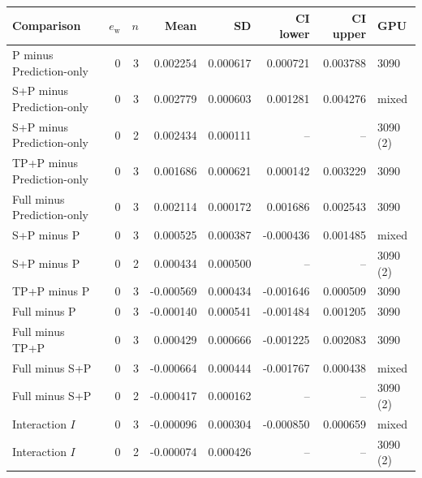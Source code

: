 \begingroup\color{revisionblue}
\sffamily\fontsize{9}{11}\selectfont\renewcommand{\arraystretch}{1.08}\setlength{\tabcolsep}{3pt}
\begin{tabular}{>{\raggedright\arraybackslash}p{42mm}rrrrrrl}

\toprule
Comparison & $e_{\mathrm{w}}$ & $n$ & Mean & SD & CI lower & CI upper & GPU \\
\midrule

P minus Prediction-only & 0 & 3 & 0.002254 & 0.000617 & 0.000721 & 0.003788 & 3090 \\

S+P minus Prediction-only & 0 & 3 & 0.002779 & 0.000603 & 0.001281 & 0.004276 & mixed \\

S+P minus Prediction-only & 0 & 2 & 0.002434 & 0.000111 & -- & -- & 3090 (2) \\

TP+P minus Prediction-only & 0 & 3 & 0.001686 & 0.000621 & 0.000142 & 0.003229 & 3090 \\

Full minus Prediction-only & 0 & 3 & 0.002114 & 0.000172 & 0.001686 & 0.002543 & 3090 \\

S+P minus P & 0 & 3 & 0.000525 & 0.000387 & -0.000436 & 0.001485 & mixed \\

S+P minus P & 0 & 2 & 0.000434 & 0.000500 & -- & -- & 3090 (2) \\

TP+P minus P & 0 & 3 & -0.000569 & 0.000434 & -0.001646 & 0.000509 & 3090 \\

Full minus P & 0 & 3 & -0.000140 & 0.000541 & -0.001484 & 0.001205 & 3090 \\

Full minus TP+P & 0 & 3 & 0.000429 & 0.000666 & -0.001225 & 0.002083 & 3090 \\

Full minus S+P & 0 & 3 & -0.000664 & 0.000444 & -0.001767 & 0.000438 & mixed \\

Full minus S+P & 0 & 2 & -0.000417 & 0.000162 & -- & -- & 3090 (2) \\

Interaction $I$ & 0 & 3 & -0.000096 & 0.000304 & -0.000850 & 0.000659 & mixed \\

Interaction $I$ & 0 & 2 & -0.000074 & 0.000426 & -- & -- & 3090 (2) \\


\end{tabular}
